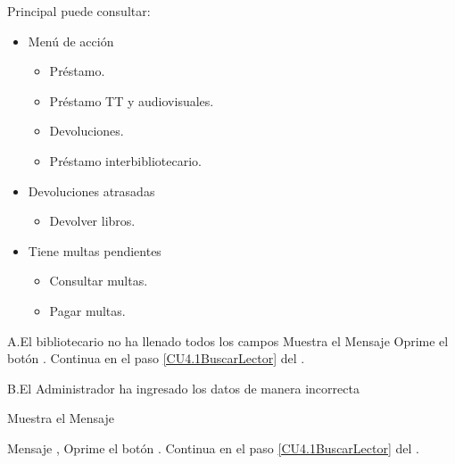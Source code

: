 \begin{UCtrayectoria}{Principal}
		\UCpaso[\UCactor] puede consultar:
			\begin{itemize}
				\item Menú de acción
					\begin{itemize}
         				\item Préstamo. 
 				        \item Préstamo TT y audiovisuales. 
 				        \item Devoluciones.  
 				        \item Préstamo interbibliotecario. 
    				\end{itemize}
				\item Devoluciones atrasadas
					\begin{itemize}
						\item Devolver libros. 
					\end{itemize}
				\item Tiene multas pendientes
					\begin{itemize}
						\item Consultar multas. 
						\item Pagar multas. 
					\end{itemize}
			\end{itemize}
		\label{CU4.3OperacionesLector}
	\end{UCtrayectoria}




				
		\begin{UCtrayectoriaA}{A.}{El bibliotecario no ha llenado todos los campos}
			\UCpaso Muestra el Mensaje 
			\UCpaso[\UCactor] Oprime el botón .
			\UCpaso Continua en el paso \ref{CU4.1BuscarLector} del .
			
		\end{UCtrayectoriaA}

		\begin{UCtrayectoriaA}{B.}{El Administrador ha ingresado los datos de manera incorrecta}

			\UCpaso Muestra el Mensaje \item Mensaje ,
			\UCpaso[\UCactor] Oprime el botón .
			\UCpaso Continua en el paso \ref{CU4.1BuscarLector} del .

		\end{UCtrayectoriaA}		

